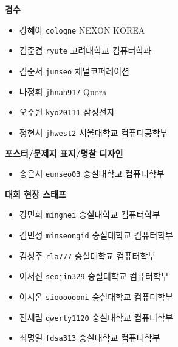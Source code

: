     \begin{frame}%
        \textbf{검수} %
        \begin{itemize}
            \item 강혜아 \tabto{1.2cm} \texttt{cologne} \tabto{8cm} {\color{gray} NEXON KOREA}
            \item 김준겸 \tabto{1.2cm} \texttt{ryute} \tabto{8cm} {\color{gray} 고려대학교 컴퓨터학과}
            \item 김준서 \tabto{1.2cm} \texttt{junseo} \tabto{8cm} {\color{gray} 채널코퍼레이션}
            \item 나정휘 \tabto{1.2cm} \texttt{jhnah917} \tabto{8cm} {\color{gray} Quora}
            \item 오주원 \tabto{1.2cm} \texttt{kyo20111} \tabto{8cm} {\color{gray} 삼성전자}
            \item 정현서 \tabto{1.2cm} \texttt{jhwest2} \tabto{8cm} {\color{gray} 서울대학교 컴퓨터공학부}
        \end{itemize}
        \vspace{3mm}
        \textbf{포스터/문제지 표지/명찰 디자인} %
        \begin{itemize}
            \item 송은서 \tabto{1.2cm} \texttt{eunseo03} \tabto{8cm} {\color{gray} 숭실대학교 컴퓨터학부}
        \end{itemize}
    \end{frame}
    
    \begin{frame}%
        \textbf{대회 현장 스태프} %
        \begin{itemize}
            \item 강민희 \tabto{1.2cm} \texttt{mingnei} \tabto{8cm} {\color{gray} 숭실대학교 컴퓨터학부}
            \item 김민성 \tabto{1.2cm} \texttt{minseongid} \tabto{8cm} {\color{gray} 숭실대학교 컴퓨터학부}
            \item 김성주 \tabto{1.2cm} \texttt{rla777} \tabto{8cm} {\color{gray} 숭실대학교 컴퓨터학부}
            \item 이서진 \tabto{1.2cm} \texttt{seojin329} \tabto{8cm} {\color{gray} 숭실대학교 컴퓨터학부}
            \item 이시온 \tabto{1.2cm} \texttt{siooooooni} \tabto{8cm} {\color{gray} 숭실대학교 컴퓨터학부}
            \item 진세림 \tabto{1.2cm} \texttt{qwerty1120} \tabto{8cm} {\color{gray} 숭실대학교 컴퓨터학부}
            \item 최명일 \tabto{1.2cm} \texttt{fdsa313} \tabto{8cm} {\color{gray} 숭실대학교 컴퓨터학부}
        \end{itemize}
    \end{frame}
    

